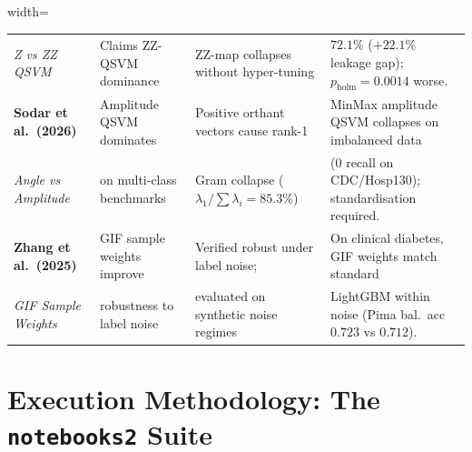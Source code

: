 \documentclass[11pt,a4paper]{article}
\begin{document}
\begin{table}[H]
\begin{adjustbox}{width=\textwidth}
\begin{tabular}{llll}
\emph{Z vs ZZ QSVM} & Claims ZZ-QSVM dominance & ZZ-map collapses without hyper-tuning & $72.1\%$ ($+22.1\%$ leakage gap); $p_{\text{holm}}=0.0014$ worse. \\
\addlinespace
\textbf{Sodar et al.\ (2026)} & Amplitude QSVM dominates & Positive orthant vectors cause rank-1 & MinMax amplitude QSVM collapses on imbalanced data \\
\emph{Angle vs Amplitude} & on multi-class benchmarks & Gram collapse ($\lambda_1/\sum\lambda_i = 85.3\%$) & ($0$ recall on CDC/Hosp130); standardisation required. \\
\addlinespace
\textbf{Zhang et al.\ (2025)} & GIF sample weights improve & Verified robust under label noise; & On clinical diabetes, GIF weights match standard \\
\emph{GIF Sample Weights} & robustness to label noise & evaluated on synthetic noise regimes & LightGBM within noise (Pima bal.\ acc $0.723$ vs $0.712$). \\
\bottomrule
\end{tabular}
\end{adjustbox}
\end{table}

\section{Execution Methodology: The \texttt{notebooks2} Suite}
\end{document}
